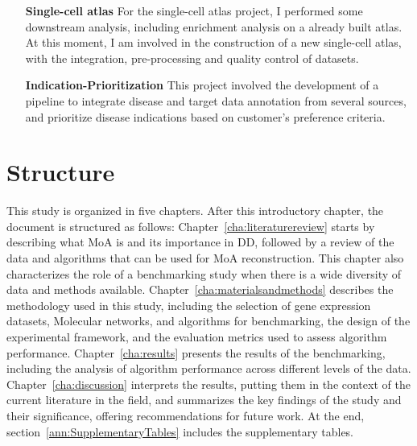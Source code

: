 \begin{enumerate}
\item[\textbf{Single-cell atlas}] For the single-cell atlas project, I performed some downstream analysis, including enrichment analysis on a already built atlas. At this moment, I am involved in the construction of a new single-cell atlas, with the integration, pre-processing and quality control of datasets.
\item[\textbf{Indication-Prioritization}] This project involved the development of a pipeline to integrate disease and target data annotation from several sources, and prioritize disease indications based on customer's preference criteria.
\end{enumerate}

\section{Structure} %
\label{sec:structure}

This study is organized in five chapters.
After this introductory chapter, the document is structured as follows: Chapter~\ref{cha:literaturereview} starts by describing what \gls{MoA} is and its importance in \gls{DD}, followed by a review of the data and algorithms that can be used for \gls{MoA} reconstruction. This chapter also characterizes the role of a benchmarking study when there is a wide diversity of data and methods available.
Chapter~\ref{cha:materialsandmethods} describes the methodology used in this study, including the selection of gene expression datasets, \gls{Molecular network}s, and algorithms for benchmarking, the design of the experimental framework, and the evaluation metrics used to assess algorithm performance.
Chapter~\ref{cha:results} presents the results of the benchmarking, including the analysis of algorithm performance across different levels of the data.
Chapter~\ref{cha:discussion} interprets the results, putting them in the context of the current literature in the field, and summarizes the key findings of the study and their significance, offering recommendations for future work.
At the end, section~\ref{ann:SupplementaryTables} includes the supplementary tables.